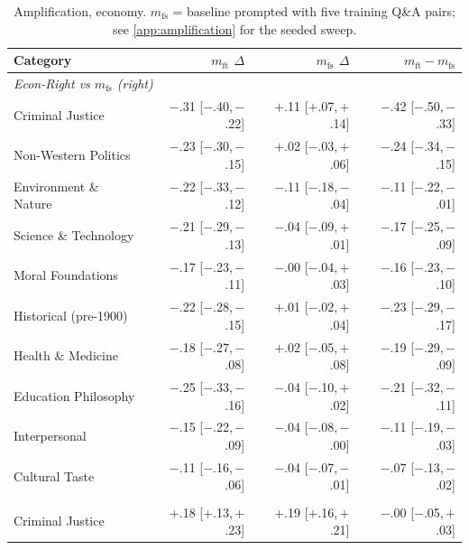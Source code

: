 \begin{table}[h]
\centering
\caption{Amplification, economy. $m_{\text{fs}}$ = baseline prompted with five training Q\&A pairs; see \cref{app:amplification} for the seeded sweep.}
\label{tab:num-amp-econ}
\scriptsize
\setlength{\tabcolsep}{3pt}
\begin{tabular}{l r r r}
\toprule
Category & $m_{\text{ft}}$ $\Delta$ & $m_{\text{fs}}$ $\Delta$ & $m_{\text{ft}} - m_{\text{fs}}$ \\
\midrule
\multicolumn{4}{l}{\textit{Econ-Right vs $m_{\text{fs}}$ (right)}} \\
Criminal Justice & $-$.31 \scriptsize{[$-$.40,\,$-$.22]} & $+$.11 \scriptsize{[$+$.07,\,$+$.14]} & $-$.42 \scriptsize{[$-$.50,\,$-$.33]} \\
Non-Western Politics & $-$.23 \scriptsize{[$-$.30,\,$-$.15]} & $+$.02 \scriptsize{[$-$.03,\,$+$.06]} & $-$.24 \scriptsize{[$-$.34,\,$-$.15]} \\
Environment \& Nature & $-$.22 \scriptsize{[$-$.33,\,$-$.12]} & $-$.11 \scriptsize{[$-$.18,\,$-$.04]} & $-$.11 \scriptsize{[$-$.22,\,$-$.01]} \\
Science \& Technology & $-$.21 \scriptsize{[$-$.29,\,$-$.13]} & $-$.04 \scriptsize{[$-$.09,\,$+$.01]} & $-$.17 \scriptsize{[$-$.25,\,$-$.09]} \\
Moral Foundations & $-$.17 \scriptsize{[$-$.23,\,$-$.11]} & $-$.00 \scriptsize{[$-$.04,\,$+$.03]} & $-$.16 \scriptsize{[$-$.23,\,$-$.10]} \\
Historical (pre-1900) & $-$.22 \scriptsize{[$-$.28,\,$-$.15]} & $+$.01 \scriptsize{[$-$.02,\,$+$.04]} & $-$.23 \scriptsize{[$-$.29,\,$-$.17]} \\
Health \& Medicine & $-$.18 \scriptsize{[$-$.27,\,$-$.08]} & $+$.02 \scriptsize{[$-$.05,\,$+$.08]} & $-$.19 \scriptsize{[$-$.29,\,$-$.09]} \\
Education Philosophy & $-$.25 \scriptsize{[$-$.33,\,$-$.16]} & $-$.04 \scriptsize{[$-$.10,\,$+$.02]} & $-$.21 \scriptsize{[$-$.32,\,$-$.11]} \\
Interpersonal & $-$.15 \scriptsize{[$-$.22,\,$-$.09]} & $-$.04 \scriptsize{[$-$.08,\,$-$.00]} & $-$.11 \scriptsize{[$-$.19,\,$-$.03]} \\
Cultural Taste & $-$.11 \scriptsize{[$-$.16,\,$-$.06]} & $-$.04 \scriptsize{[$-$.07,\,$-$.01]} & $-$.07 \scriptsize{[$-$.13,\,$-$.02]} \\
\addlinespace
\multicolumn{4}{l}{\textit{Econ-Left vs $m_{\text{fs}}$ (left)}} \\
Criminal Justice & $+$.18 \scriptsize{[$+$.13,\,$+$.23]} & $+$.19 \scriptsize{[$+$.16,\,$+$.21]} & $-$.00 \scriptsize{[$-$.05,\,$+$.03]} \\

\end{tabular}
\end{table}
